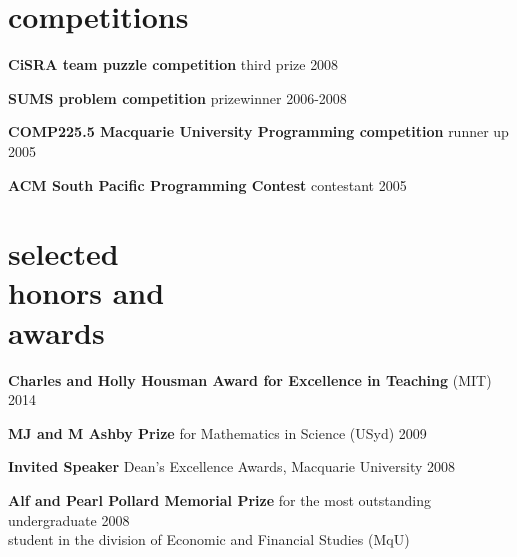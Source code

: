 \documentclass[margin,line]{resume}
\newcommand{\dashtab}{\makebox[1cm][r]{$-$ }}
\newcommand{\whitetab}{\makebox[1cm][r]{ }}
\newcommand{\CVsection}[1]{\section{\mysidestyle #1}}
\newcommand{\entry}[3]{\textbf{#1} #2 \hfill {#3}
           
\vspace{-3.4mm}}
\newcommand{\twolineentry}[4]{\textbf{#1} #2 \hfill {#4}\\%
#3
           
\vspace{-3.4mm}}
\newcommand{\FINALentry}[3]{\textbf{#1} #2 \hfill {#3}\\\vspace{-.55cm}}
\newcommand{\FINALtwolineentry}[4]{\textbf{#1} #2 \hfill {#4}\\%
#3\\\vspace{-.55cm}}
\begin{document}
\begin{resume}
\CVsection{competitions}
\entry{CiSRA team puzzle competition}{third prize}{2008}
\entry{SUMS problem competition}{prizewinner}{2006-2008}%
\entry{COMP225.5 Macquarie University Programming competition}{runner up}{2005}
\FINALentry{ACM South Pacific Programming Contest}{contestant}{2005}

\CVsection{selected\\honors and\\awards} 
\entry{Charles and Holly Housman Award for Excellence in Teaching}{(MIT)}{2014}
\entry{MJ and M Ashby Prize}{for Mathematics in Science (USyd)}{2009}
\entry{Invited Speaker}{Dean's Excellence Awards, Macquarie University}{2008}
\FINALtwolineentry{Alf and Pearl Pollard Memorial Prize}{for the most outstanding undergraduate}{student in the division of Economic and Financial Studies (MqU)}{2008}






\end{resume}
\end{document}
